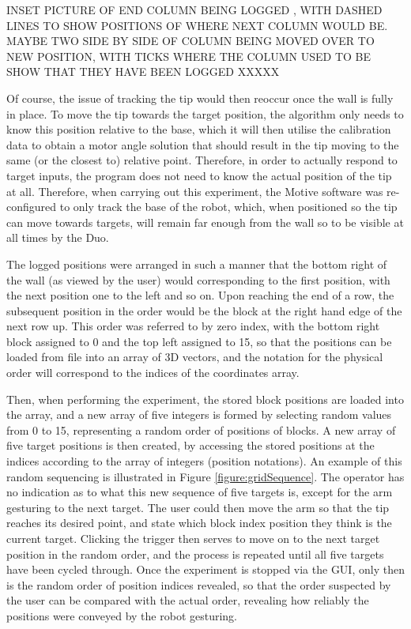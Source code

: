 \documentclass[11pt]{article}
\begin{document}
INSET PICTURE OF END COLUMN BEING LOGGED , WITH DASHED LINES TO SHOW POSITIONS OF WHERE NEXT COLUMN WOULD BE. MAYBE TWO SIDE BY SIDE OF COLUMN BEING MOVED OVER TO NEW POSITION, WITH TICKS WHERE THE COLUMN USED TO BE SHOW THAT THEY HAVE BEEN LOGGED XXXXX

Of course, the issue of tracking the tip would then reoccur once the wall is fully in place. To move the tip towards the target position, the algorithm only needs to know this position relative to the base, which it will then utilise the calibration data to obtain a motor angle solution that should result in the tip moving to the same (or the closest to) relative point. Therefore, in order to actually respond to target inputs, the program does not need to know the actual position of the tip at all. Therefore, when carrying out this experiment, the Motive software was re-configured to only track the base of the robot, which, when positioned so the tip can move towards targets, will remain far enough from the wall so to be visible at all times by the Duo. 

The logged positions were arranged in such a manner that the bottom right of the wall (as viewed by the user) would corresponding to the first position, with the next position one to the left and so on. Upon reaching the end of a row, the subsequent position in the order would be the block at the right hand edge of the next row up. This order was referred to by zero index, with the bottom right block assigned to 0 and the top left assigned to 15, so that the positions can be loaded from file into an array of 3D vectors, and the notation for the physical order will correspond to the indices of the coordinates array. 

Then, when performing the experiment, the stored block positions are loaded into the array, and a new array of five integers is formed by selecting random values from 0 to 15, representing a random order of positions of blocks. A new array of five target positions is then created, by accessing the stored positions at the indices according to the array of integers (position notations). An example of this random sequencing is illustrated in Figure \ref{figure:gridSequence}. The operator has no indication as to what this new sequence of five targets is, except for the arm gesturing to the next target. The user could then move the arm so that the tip reaches its desired point, and state which block index position they think is the current target. Clicking the trigger then serves to move on to the next target position in the random order, and the process is repeated until all five targets have been cycled through. Once the experiment is stopped via the GUI, only then is the random order of position indices revealed, so that the order suspected by the user can be compared with the actual order, revealing how reliably the positions were conveyed by the robot gesturing.
\end{document}
